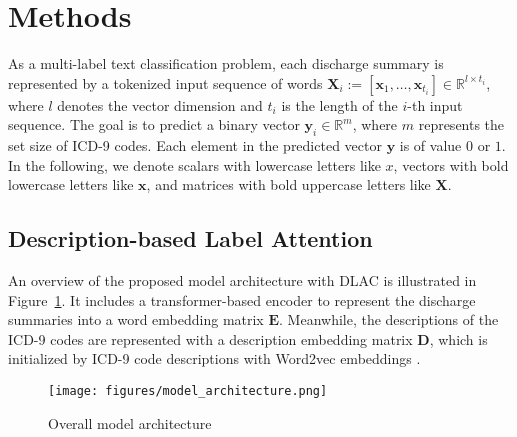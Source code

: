 \documentclass[11pt]{article}
\begin{document}

\section{Methods}
As a multi-label text classification problem, each discharge summary is represented by a tokenized input sequence of words $\boldsymbol{X}_i:=[\boldsymbol{x}_1, \dots, \boldsymbol{x}_{t_i}]\in\mathbb{R}^{l\times t_i}$, where $l$ denotes the vector dimension and $t_i$ is the length of the $i$-th input sequence. The goal is to predict a binary vector $\boldsymbol{y}_i\in \mathbb{R}^m$, where $m$ represents the set size of ICD-9 codes.
Each element in the predicted vector $\boldsymbol{y}$ is of value $0$ or $1$. In the following, we denote scalars with lowercase letters like $x$, vectors with bold lowercase letters like $\boldsymbol{x}$, and matrices with bold uppercase letters like $\boldsymbol{X}$.

\subsection{Description-based Label Attention}

An overview of the proposed model architecture with DLAC is illustrated in Figure~\ref{fig:overall_model_architecture}. It includes a transformer-based encoder to represent the discharge summaries into a word embedding matrix $\boldsymbol{E}$. Meanwhile, the descriptions of the ICD-9 codes are represented with a description embedding matrix $\boldsymbol{D}$, which is initialized by ICD-9 code descriptions with Word2vec embeddings \citep{mikolov2013distributed}. 
\begin{figure}[hb]
\centering
\texttt{[image: figures/model\_architecture.png]}
\caption{Overall model architecture}
\label{fig:overall_model_architecture}
\end{figure}
\end{document}
